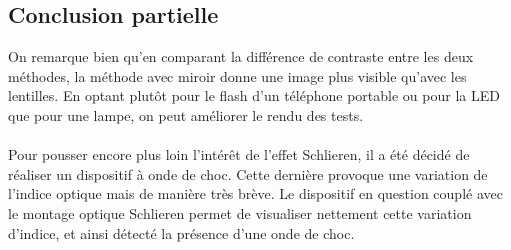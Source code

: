 \subsection{Conclusion partielle}
On remarque bien qu'en comparant la différence de contraste entre les deux méthodes, la méthode avec miroir donne une image plus visible qu'avec les lentilles. En optant plutôt pour le flash d'un téléphone portable ou pour la LED que pour une lampe, on peut améliorer le rendu des tests.\\
\\
Pour pousser encore plus loin l'intérêt de l’effet Schlieren, il a été décidé de réaliser un dispositif à onde de choc. Cette dernière provoque une variation de l’indice optique mais de manière très brève. Le dispositif en question couplé avec le montage optique Schlieren permet de visualiser nettement cette variation d’indice, et ainsi détecté la présence d’une onde de choc.  
